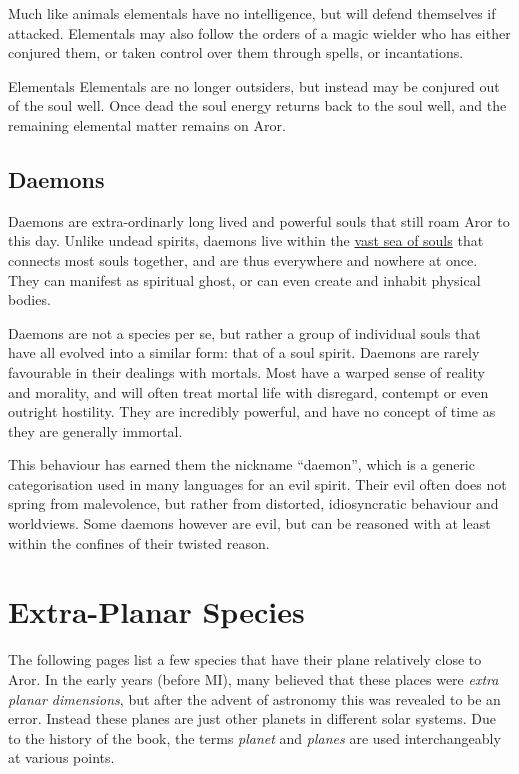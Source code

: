 Much like animals elementals have no intelligence, but will defend themselves
if attacked. Elementals may also follow the orders of a magic wielder who
has either conjured them, or taken control over them through spells, or
incantations.

\begin{35e}{Elementals}
  Elementals are no longer outsiders, but instead may be conjured out of the
  soul well. Once dead the soul energy returns back to the soul well, and the
  remaining elemental matter remains on Aror.
\end{35e}

\subsection{Daemons}
\label{sec:Daemons}

Daemons are extra-ordinarly long lived and powerful souls that still roam Aror
to this day. Unlike undead spirits, daemons live within the \hyperref[sec:Soul
  Well]{vast sea of souls} that connects most souls together, and are thus
everywhere and nowhere at once. They can manifest as spiritual ghost, or can
even create and inhabit physical bodies.

Daemons are not a species per se, but rather a group of individual souls that
have all evolved into a similar form: that of a soul spirit. Daemons are
rarely favourable in their dealings with mortals. Most have a warped sense of
reality and morality, and will often treat mortal life with disregard,
contempt or even outright hostility. They are incredibly powerful, and have
no concept of time as they are generally immortal.

This behaviour has earned them the nickname ``daemon'', which is a generic
categorisation used in many languages for an evil spirit. Their evil often
does not spring from malevolence, but rather from distorted, idiosyncratic
behaviour and worldviews. Some daemons however are evil, but can be reasoned
with at least within the confines of their twisted reason.



\section{Extra-Planar Species}
\label{sec:ExtraPlanar Species}

The following pages list a few species that have their plane relatively close
to Aror. In the early years (before MI), many believed that these places were
\emph{extra planar dimensions}, but after the advent of astronomy this was
revealed to be an error. Instead these planes are just other planets in
different solar systems. Due to the history of the book, the terms
\emph{planet} and \emph{planes} are used interchangeably at various points.

